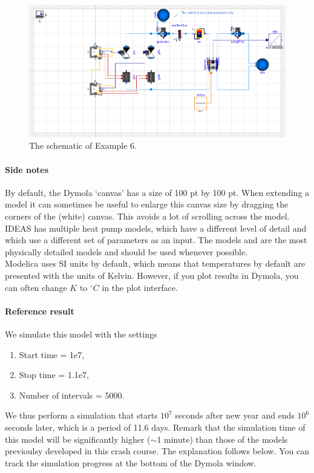 \documentclass[10pt,a4paper]{article}
\begin{document}
\begin{figure}[h!]
	\centering
	\includegraphics[width=\linewidth]{Schematic6.png}
	\caption{The schematic of Example 6.}
	\label{fig:sche}
\end{figure}

\newpage

\paragraph{Side notes}
By default, the Dymola `canvas' has a size of 100 pt by 100 pt. 
When extending a model  it can sometimes be useful to enlarge this canvas size by dragging
the corners of the (white) canvas. 
This avoids a lot of scrolling across the model.\\

IDEAS has multiple heat pump models, which have a different level of detail
and which use a different set of parameters as an input.
The models 
and  are
the most physically detailed models and should be used whenever possible.\\

Modelica uses SI units by default, which means that temperatures by default 
are presented with the units of Kelvin. However, if you plot results in Dymola, you can often change $K$ to $^{\circ}C$ in the plot interface.

\paragraph{Reference result}
We simulate this model with the settings
\begin{enumerate}
\item Start time = 1e7,
\item Stop time = 1.1e7,
\item Number of intervals = 5000.
\end{enumerate}
We thus perform a simulation that starts $10^7$ seconds after new year and ends $10^6$
seconds later, which is a period of 11.6 days. Remark that the simulation time of this model will be significantly higher ($\sim$1 minute) than those of the models previoulsy developed in this crash course. The explanation follows below. You can track the simulation progress at the bottom of the Dymola window. \\
\end{document}
